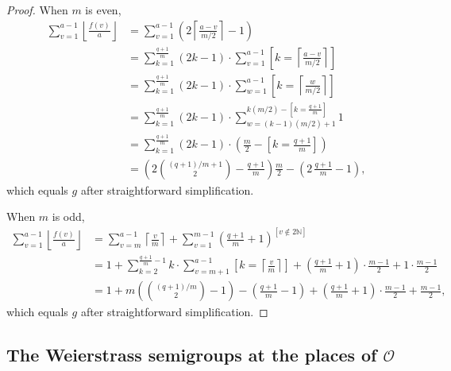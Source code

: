\documentclass[12pt]{amsart}
\theoremstyle{remark}
\theoremstyle{definition}
\begin{document}
\begin{proof}
    When $m$ is even,
    \begin{align*}
        \sum_{v=1}^{a-1}\left\lfloor\frac{f(v)}{a}\right\rfloor
        &= \sum_{v=1}^{a-1}\left(2\left\lceil\frac{a-v}{m/2}\right\rceil-1\right) \\
        &= \sum_{k=1}^{\frac{q+1}{m}}\left(2k-1\right)
           \cdot\sum_{v=1}^{a-1}
           \left[k=\left\lceil\tfrac{a-v}{m/2}\right\rceil\right] \\
        &= \sum_{k=1}^{\frac{q+1}{m}}\left(2k-1\right)
           \cdot\sum_{w=1}^{a-1}
           \left[k=\left\lceil\tfrac{w}{m/2}\right\rceil\right] \\
        &= \sum_{k=1}^{\frac{q+1}{m}}\left(2k-1\right)
           \cdot\sum_{w=(k-1)(m/2)+1}^{k(m/2)-[k=\frac{q+1}{m}]}1 \\
        &= \sum_{k=1}^{\frac{q+1}{m}}\left(2k-1\right)
           \cdot\left(\frac{m}{2}-\left[k=\tfrac{q+1}{m}\right]\right) \\
        &= \left(2\binom{(q+1)/m+1}{2}-\frac{q+1}{m}\right)\frac{m}{2}
           - \left(2\,\frac{q+1}{m}-1\right),
    \end{align*}
    which equals $g$ after straightforward simplification.

    When $m$ is odd,
    \begin{align*}
        \sum_{v=1}^{a-1}\left\lfloor\frac{f(v)}{a}\right\rfloor
        &= \sum_{v=m}^{a-1}\left\lceil\frac{v}{m}\right\rceil
           + \sum_{v=1}^{m-1}
             \left(\frac{q+1}{m}+1\right)^{[v\notin 2\mathbb{N}]} \\
        &= 1 + \sum_{k=2}^{\frac{q+1}{m}-1} k
             \cdot\sum_{v=m+1}^{a-1}
             \left[k=\left\lceil\tfrac{v}{m}\right\rceil\right]
           + \left(\frac{q+1}{m}+1\right)\cdot\frac{m-1}{2}
           + 1\cdot\frac{m-1}{2} \\
        &= 1 + m\!\left(\binom{(q+1)/m}{2}-1\right)
           - \left(\frac{q+1}{m}-1\right)
           + \left(\frac{q+1}{m}+1\right)\cdot\frac{m-1}{2}
           + \frac{m-1}{2},
    \end{align*}
    which equals $g$ after straightforward simplification.
\end{proof}

 
	\subsection{\texorpdfstring
{The Weierstrass semigroups at the places of $\mathcal{O}$}
{The Weierstrass semigroups at the places of O}}
\end{document}
